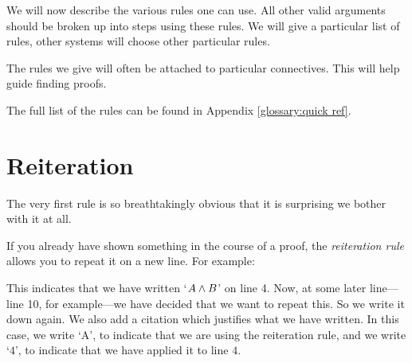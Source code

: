 %
%

We will now describe the various rules one can use. All other valid arguments should be broken up into steps using these rules. We will give a particular list of rules, other systems will choose other particular rules.

The rules we give will often be attached to particular connectives. This will help guide finding proofs.

The full list of the rules can be found in Appendix \ref{glossary:quick ref}.



\section{Reiteration}\label{s:Reiteration}
The very first rule is so breathtakingly obvious that it is surprising we bother with it at all.

If you already have shown something in the course of a proof, the \emph{reiteration rule} allows you to repeat it on a new line. For example:
\begin{pf}
	\have[$\vdots$]{}{\vdots}
	 
\end{pf}
This indicates that we have written `$A \mathbin{\wedge} B$' on line 4. Now, at some later line---line 10, for example---we have decided that we want to repeat this. So we write it down again. We also add a citation which justifies what we have written. In this case, we write `A', to indicate that we are using the reiteration rule, and we write `$4$', to indicate that we have applied it to line $4$.


